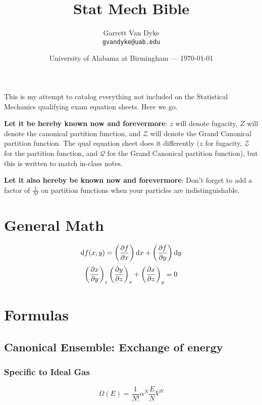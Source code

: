 \documentclass{article}
\title{Stat Mech Bible} %
\author{Garrett Van Dyke\\ \texttt{gvandyke@uab.edu}} %
\date{University of Alabama at Birmingham --- \today} %
\begin{document}
\maketitle %



This is my attempt to catalog everything not included on the Statistical Mechanics qualifying exam equation sheets. Here we go. \medskip

\textbf{Let it be hereby known now and forevermore}: $z$ will denote fugacity, $Z$ will denote the canonical partition function, and $\mathcal{Z}$ will denote the Grand Canonical partition function. The qual equation sheet does it differently ($z$ for fugacity, $\mathcal{Z}$ for the partition function, and $\mathcal{Q}$ for the Grand Canonical partition function), but this is written to match in-class notes.\medskip

\textbf{Let it also hereby be known now and forevermore}: Don't forget to add a factor of $\frac{1}{N!}$ on partition functions when your particles are indistinguishable.

\section{General Math}
\begin{equation}
	\dif f(x,y)= \left(\pdv{f}{x}\right)\dif x + \left(\pdv{f}{y}\right)\dif y
\end{equation}
\begin{equation}
	\left(\pdv{x}{y}\right)_z\left(\pdv{y}{z}\right)_x+\left(\pdv{x}{z}\right)_y=0
\end{equation}


\section{Formulas}
\subsection{Canonical Ensemble: \normalfont Exchange of energy}
\subsubsection{Specific to Ideal Gas}
\begin{equation}
	\Omega(E)=\frac{1}{N!}\alpha^N \frac{E}{N}V^N
\end{equation}
\end{document}
